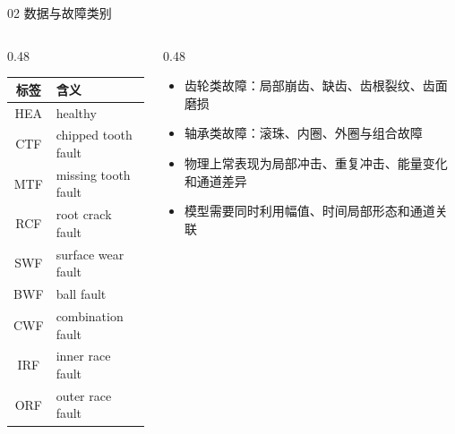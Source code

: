 \documentclass[aspectratio=169]{beamer}
\newcommand{\tightitems}{\setlength{\itemsep}{0.32em}}
\begin{document}
\begin{frame}{02 数据与故障类别}
    \small
    \begin{columns}[T,onlytextwidth]
        \begin{column}{0.48\textwidth}
            \begin{table}
                \centering
                \small
                \begin{tabular}{cl}
                    \toprule
                    标签 & 含义 \\
                    \midrule
                    HEA & healthy \\
                    CTF & chipped tooth fault \\
                    MTF & missing tooth fault \\
                    RCF & root crack fault \\
                    SWF & surface wear fault \\
                    BWF & ball fault \\
                    CWF & combination fault \\
                    IRF & inner race fault \\
                    ORF & outer race fault \\
                    \bottomrule
                \end{tabular}
            \end{table}
        \end{column}
        \begin{column}{0.48\textwidth}
            \begin{itemize}
                \tightitems
                \item 齿轮类故障：局部崩齿、缺齿、齿根裂纹、齿面磨损
                \item 轴承类故障：滚珠、内圈、外圈与组合故障
                \item 物理上常表现为局部冲击、重复冲击、能量变化和通道差异
                \item 模型需要同时利用幅值、时间局部形态和通道关联
            \end{itemize}
        \end{column}
    \end{columns}
\end{frame}
\end{document}
